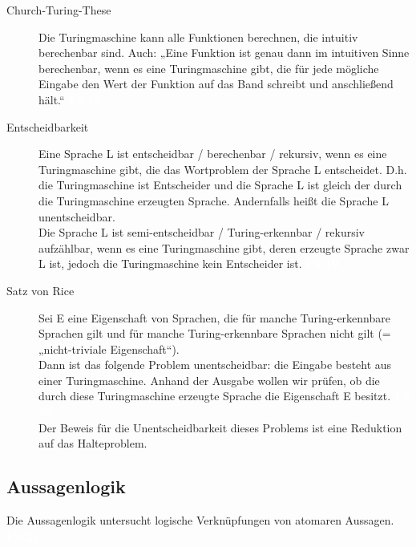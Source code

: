 \documentclass[a4paper,10pt]{article}
\newcommand{\vl}[1]{\colorbox{vl}{\textcolor{white}{\small\textbf{#1}}}}
\begin{document}
\begin{description}
        \item[Church-Turing-These]
            Die Turingmaschine kann alle Funktionen berechnen, die intuitiv berechenbar sind. Auch: „Eine Funktion ist genau dann
            im intuitiven Sinne berechenbar, wenn es eine Turingmaschine gibt, die für jede mögliche Eingabe den Wert der Funktion auf
            das Band schreibt und anschließend hält.“ \vl{FS 18}

        \item[Entscheidbarkeit]
            Eine Sprache L ist entscheidbar / berechenbar / rekursiv, wenn es eine Turingmaschine gibt, die das Wortproblem der Sprache L entscheidet.
            D.h. die Turingmaschine ist Entscheider und die Sprache L ist gleich der durch die Turingmaschine erzeugten Sprache.
            Andernfalls heißt die Sprache L unentscheidbar. \\
            Die Sprache L ist semi-entscheidbar / Turing-erkennbar / rekursiv aufzählbar, wenn es eine Turingmaschine gibt, deren erzeugte Sprache zwar L ist, jedoch die Turingmaschine kein Entscheider ist. \vl{FS 19}

        \item[Satz von Rice]
            Sei E eine Eigenschaft von Sprachen, die für manche Turing-erkennbare Sprachen gilt und für manche Turing-erkennbare Sprachen nicht gilt (= „nicht-triviale Eigenschaft“). \\ Dann ist das folgende Problem unentscheidbar: die Eingabe besteht aus einer Turingmaschine. Anhand der Ausgabe wollen wir prüfen, ob die durch diese Turingmaschine erzeugte Sprache die Eigenschaft E besitzt. \vl{FS 20} \\
            Der Beweis für die Unentscheidbarkeit dieses Problems ist eine Reduktion auf das Halteproblem.

    \end{description}

    \newpage
    \subsection{Aussagenlogik}
        Die Aussagenlogik untersucht logische Verknüpfungen von atomaren Aussagen. \vl{FS 21}
\end{document}
